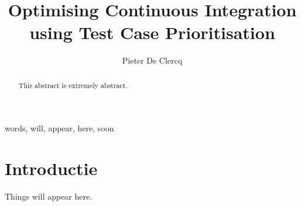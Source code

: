 \documentclass[10pt,twocolumn,twoside]{phdsymp-en}
\begin{document}
	\title{Optimising Continuous Integration using Test Case Prioritisation}
	\author{Pieter De Clercq}
	\maketitle
	
	\begin{abstract}
		This abstract is extremely abstract.
	\end{abstract}

	\begin{keywords}
		words, will, appear, here, soon
	\end{keywords}

	\section{Introductie}
	Things will appear here. \cite{cusumanomicrosoft}
	
	
	
\end{document}
